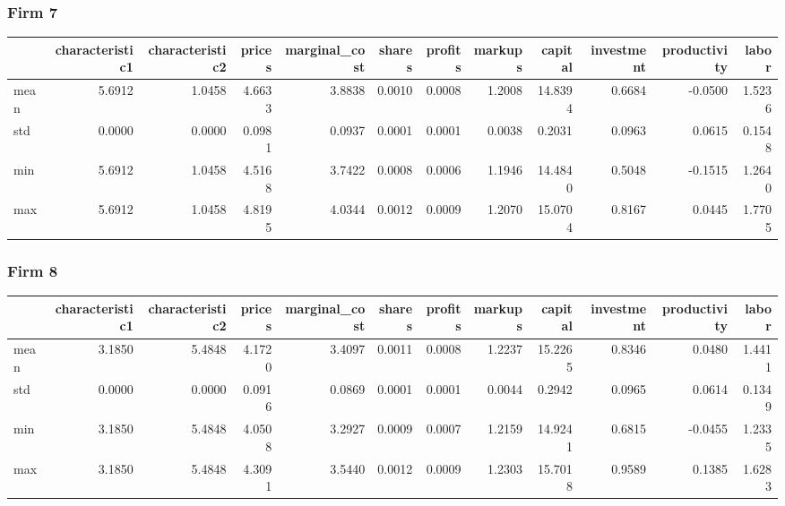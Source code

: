  \subsubsection*{Firm 7}
\begin{tabular}{lrrrrrrrrrrr}
\toprule
{} &  characteristic1 &  characteristic2 &  prices &  marginal\_cost &  shares &  profits &  markups &  capital &  investment &  productivity &  labor \\
\midrule
mean &           5.6912 &           1.0458 &  4.6633 &         3.8838 &  0.0010 &   0.0008 &   1.2008 &  14.8394 &      0.6684 &       -0.0500 & 1.5236 \\
std  &           0.0000 &           0.0000 &  0.0981 &         0.0937 &  0.0001 &   0.0001 &   0.0038 &   0.2031 &      0.0963 &        0.0615 & 0.1548 \\
min  &           5.6912 &           1.0458 &  4.5168 &         3.7422 &  0.0008 &   0.0006 &   1.1946 &  14.4840 &      0.5048 &       -0.1515 & 1.2640 \\
max  &           5.6912 &           1.0458 &  4.8195 &         4.0344 &  0.0012 &   0.0009 &   1.2070 &  15.0704 &      0.8167 &        0.0445 & 1.7705 \\
\bottomrule
\end{tabular}


 \subsubsection*{Firm 8}
\begin{tabular}{lrrrrrrrrrrr}
\toprule
{} &  characteristic1 &  characteristic2 &  prices &  marginal\_cost &  shares &  profits &  markups &  capital &  investment &  productivity &  labor \\
\midrule
mean &           3.1850 &           5.4848 &  4.1720 &         3.4097 &  0.0011 &   0.0008 &   1.2237 &  15.2265 &      0.8346 &        0.0480 & 1.4411 \\
std  &           0.0000 &           0.0000 &  0.0916 &         0.0869 &  0.0001 &   0.0001 &   0.0044 &   0.2942 &      0.0965 &        0.0614 & 0.1349 \\
min  &           3.1850 &           5.4848 &  4.0508 &         3.2927 &  0.0009 &   0.0007 &   1.2159 &  14.9241 &      0.6815 &       -0.0455 & 1.2335 \\
max  &           3.1850 &           5.4848 &  4.3091 &         3.5440 &  0.0012 &   0.0009 &   1.2303 &  15.7018 &      0.9589 &        0.1385 & 1.6283 \\
\bottomrule
\end{tabular}


